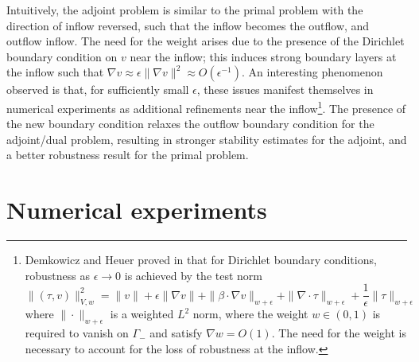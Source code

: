\documentclass[11pt,onecolumn]{scrartcl}
\newcommand{\grad}{\nabla}
\renewcommand{\div}{\grad \cdot}
\begin{document}
Intuitively, the adjoint problem is similar to the primal problem with the direction of inflow reversed, such that the inflow becomes the outflow, and outflow inflow.  The need for the weight arises due to the presence of the Dirichlet boundary condition on $v$ near the inflow; this induces strong boundary layers at the inflow such that $\grad v \approx \epsilon \|\grad v\|^2 \approx O(\epsilon^{-1})$. An interesting phenomenon observed is that, for sufficiently small $\epsilon$, these issues manifest themselves in numerical experiments as additional refinements near the inflow\footnote{Demkowicz and Heuer proved in \cite{DPGrobustness} that for Dirichlet boundary conditions, robustness as $\epsilon \rightarrow 0$ is achieved by the test norm
\[
\|\left(\tau, v\right)\|_{V,w}^2 = \|v\| + \epsilon \|\grad v\| + \|\beta \cdot \grad v\|_{w+\epsilon} + \| \div \tau\|_{w+\epsilon} + \frac{1}{\epsilon}\|\tau\|_{w+\epsilon}
\]
where $\|\cdot \|_{w+\epsilon}$ is a weighted $L^2$ norm, where the weight $w \in (0,1)$ is required to vanish on $\Gamma_-$ and satisfy $\grad w = O(1)$. The need for the weight is necessary to account for the loss of robustness at the inflow.}.  The presence of the new boundary condition relaxes the outflow boundary condition for the adjoint/dual problem, resulting in stronger stability estimates for the adjoint, and a better robustness result for the primal problem.  


\section{Numerical experiments}
\end{document}
